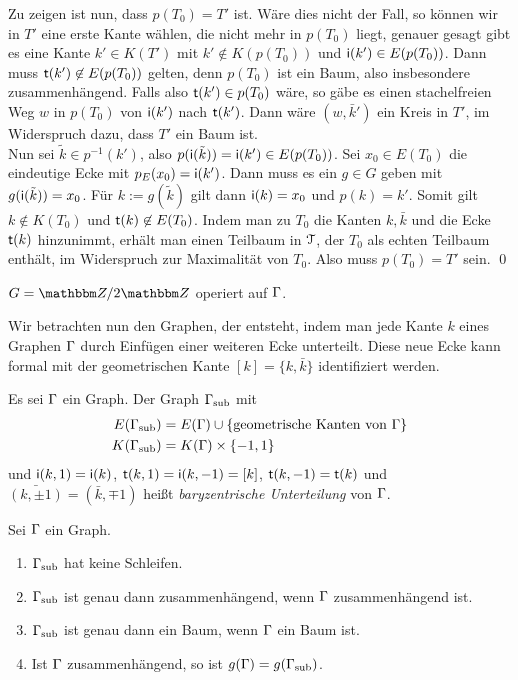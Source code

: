 Zu zeigen ist nun, dass $p(T_0)=T'$ ist.
Wäre dies nicht der Fall, so können wir in $T'$ eine erste Kante
wählen, die nicht mehr in $p(T_0)$ liegt, genauer gesagt gibt es eine
Kante $k'\in K(T')$ mit $k'\not\in K(p(T_0))$ und
$\mathsf{i}(k')\in E(p(T_0))$. Dann muss $\mathsf{t}(k')\not\in E(p(T_0))$ gelten,
denn $p(T_0)$ ist ein Baum, also insbesondere zusammenhängend.
Falls also $\mathsf{t}(k')\in p(T_0)$ wäre, so gäbe es einen stachelfreien
Weg $w$ in $p(T_0)$ von $\mathsf{i}(k')$ nach $\mathsf{t}(k')$.
Dann wäre $(w, \bar{k}')$ ein Kreis in $T'$, im Widerspruch dazu,
dass $T'$ ein Baum ist.\\
Nun sei $\tilde{k}\in p^{-1}(k')$, also
$p(\mathsf{i}(\tilde{k}))=\mathsf{i}(k') \in E(p(T_0))$.
Sei $x_0 \in E(T_0)$ die eindeutige Ecke mit $p_E(x_0)=\mathsf{i}(k')$.
Dann muss es ein $g\in G$ geben mit $g(\mathsf{i}(\tilde{k}))=x_0$.
Für $k:=g(\tilde{k})$ gilt dann $\mathsf{i}(k)=x_0$ und $p(k)=k'$.
Somit gilt $k\not\in K(T_0)$ und $\mathsf{t}(k)\not\in E(T_0)$.
Indem man zu $T_0$ die Kanten $k,\bar{k}$ und die Ecke $\mathsf{t}(k)$
hinzunimmt, erhält man einen Teilbaum in $\mathcal{T}$, der $T_0$ als
echten Teilbaum enthält, im Widerspruch zur Maximalität von $T_0$.
Also muss $p(T_0)=T'$ sein.
\qed

\BSP $G=\ZZ/2\ZZ$ operiert auf $\Gamma$.
\begin{center}
\end{center}

Wir betrachten nun den Graphen, der entsteht, indem man jede Kante $k$
eines Graphen $\Gamma$ durch Einfügen einer weiteren
Ecke unterteilt. Diese neue Ecke kann formal mit der geometrischen
Kante $[k]=\{k,\bar{k}\}$ identifiziert werden.

\DEF Es sei $\Gamma$ ein Graph. Der Graph $\Gamma_{\text{sub}}$ mit
\begin{align*}
E(\Gamma_{\text{sub}}) &= E(\Gamma)\cup\{\text{geometrische Kanten von }\Gamma\} \\
K(\Gamma_{\text{sub}}) &= K(\Gamma)\times\{-1,1\}
\end{align*}
und
$\mathsf{i}(k,1)=\mathsf{i}(k)$, $\mathsf{t}(k,1)=\mathsf{i}(k,-1)=[k]$,
$\mathsf{t}(k,-1)=\mathsf{t}(k)$ und $\bar{(k, \pm 1)}=(\bar{k},\mp 1)$
heißt \emph{baryzentrische Unterteilung}
von $\Gamma$.
\begin{center}
\end{center}

\BEM Sei $\Gamma$ ein Graph.
\begin{enumerate}
\item $\Gamma_{\text{sub}}$ hat keine Schleifen.
\item $\Gamma_{\text{sub}}$ ist genau dann zusammenhängend, wenn $\Gamma$
	zusammenhängend ist.
\item $\Gamma_{\text{sub}}$ ist genau dann ein Baum, wenn $\Gamma$ ein Baum ist.
\item Ist $\Gamma$ zusammenhängend, so ist $g(\Gamma)=g(\Gamma_{\text{sub}})$.
\end{enumerate}

